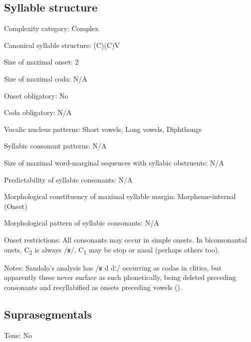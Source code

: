 {\subsection*{Syllable structure}
\begin{appendixdesc}

\item[Complexity category:] Complex

\item[Canonical syllable structure:] (C)(C)V \citep[17--18]{Sandalo1997}

\item[Size of maximal onset:] 2

\item[Size of maximal coda:] N/A

\item[Onset obligatory:] No

\item[Coda obligatory:] N/A

\item[Vocalic nucleus patterns:] Short vowels, Long vowels, Diphthongs

\item[Syllabic consonant patterns:] N/A

\item[Size of maximal word-marginal sequences with syllabic obstruents:] N/A

\item[Predictability of syllabic consonants:] N/A

\item[Morphological constituency of maximal syllable margin:] Morpheme-internal (Onset)

\item[Morphological pattern of syllabic consonants:] N/A

\item[Onset restrictions:] All consonants may occur in simple onsets. In biconsonantal onets, C\textsubscript{2} is always /ʁ/, C\textsubscript{1} may be stop or nasal (perhaps others too).

\item[Notes:] Sandalo’s analysis has /ʁ d dː/ occurring as codas in clitics, but apparently these never surface as such phonetically, being deleted preceding consonants and resyllabified as onsets preceding vowels (\citeyear[16]{Sandalo1997}).
\end{appendixdesc}
\subsection*{Suprasegmentals}
\begin{appendixdesc}
\item[Tone:] No


\end{appendixdesc}}
